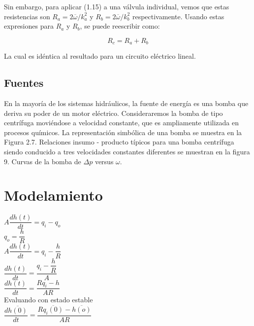 \documentclass[a4paper,12pt,twoside]{proyectotanquesecci}
\begin{document}
Sin embargo, para aplicar (1.15) a una válvula individual, vemos que estas resistencias son $R_{a}=2\overline{\omega}/k^{2}_{a}$ y $R_{b}=2\overline{\omega}/k^{2}_{b}$ respectivamente. Usando estas expresiones para $R_{a}$ y $R_{b}$, se puede reescribir como:

\begin{equation}
R_{c}=R_{a}+R_{b}
\end{equation}

La cual es idéntica al resultado para un circuito eléctrico lineal.

\subsection{Fuentes}

En la mayoría de los sistemas hidráulicos, la fuente de energía es una bomba que deriva su poder de un motor eléctrico. Consideraremos la bomba de tipo centrífuga moviéndose a velocidad constante, que es ampliamente utilizada en procesos químicos. La representación simbólica de una bomba se muestra en la Figura 2.7. Relaciones insumo - producto típicos para una bomba centrífuga siendo conducido a tres velocidades constantes diferentes se muestran en la figura 9. Curvas de la bomba de $\Delta p$ versus $\omega$.\\

\newpage





\section{Modelamiento}

$A\dfrac {dh\left( t\right) }{dt}=q_{i}-q_{o}$ \\
$q_{o}=\dfrac{h}{R}$ \\

$A\dfrac {dh\left( t\right) }{dt}=q_{i}-\dfrac {h}{R}$ \\
$\dfrac {dh\left( t\right) }{dt}=\dfrac {q_{i}-\dfrac {h}{R}}{A}$ \\
$\dfrac {dh\left( t\right) }{dt}=\dfrac {Rq_{i}-h}{AR}$ \\


Evaluando con estado estable \\
$\dfrac {d\overline {h\left( 0\right) }}{dt}=\dfrac {R\overline {q_{i}\left( 0\right) }-\overline {h\left( o\right) }}{AR}$ \\
\end{document}
